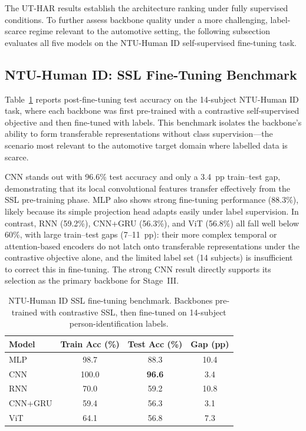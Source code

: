\documentclass[english,bibtex]{kththesis}
\begin{document}
The UT-HAR results establish the architecture ranking under fully supervised conditions. To further assess backbone quality under a more challenging, label-scarce regime relevant to the automotive setting, the following subsection evaluates all five models on the NTU-Human ID self-supervised fine-tuning task.

\subsection{NTU-Human ID: SSL Fine-Tuning Benchmark}
\label{sec:humanid}

Table~\ref{tab:humanid} reports post-fine-tuning test accuracy on the 14-subject NTU-Human ID task, where each backbone was first pre-trained with a contrastive self-supervised objective and then fine-tuned with labels. This benchmark isolates the backbone's ability to form transferable representations without class supervision---the scenario most relevant to the automotive target domain where labelled data is scarce.

CNN stands out with 96.6\% test accuracy and only a 3.4~pp train--test gap, demonstrating that its local convolutional features transfer effectively from the SSL pre-training phase. MLP also shows strong fine-tuning performance (88.3\%), likely because its simple projection head adapts easily under label supervision. In contrast, RNN (59.2\%), CNN+GRU (56.3\%), and ViT (56.8\%) all fall well below 60\%, with large train--test gaps (7--11~pp): their more complex temporal or attention-based encoders do not latch onto transferable representations under the contrastive objective alone, and the limited label set (14 subjects) is insufficient to correct this in fine-tuning. The strong CNN result directly supports its selection as the primary backbone for Stage~III.

\begin{table}[!ht]
\caption{NTU-Human ID SSL fine-tuning benchmark. Backbones pre-trained with contrastive SSL, then fine-tuned on 14-subject person-identification labels.}
\label{tab:humanid}
\centering
\begin{tabular}{lccc}
\toprule
\textbf{Model} & \textbf{Train Acc (\%)} & \textbf{Test Acc (\%)} & \textbf{Gap (pp)} \\
\midrule
MLP      &  98.7  &  88.3  & 10.4 \\
CNN      & 100.0  & \textbf{96.6}  &  3.4 \\
RNN      &  70.0  &  59.2  & 10.8 \\
CNN+GRU  &  59.4  &  56.3  &  3.1 \\
ViT      &  64.1  &  56.8  &  7.3 \\
\bottomrule
\end{tabular}
\end{table}
\end{document}
